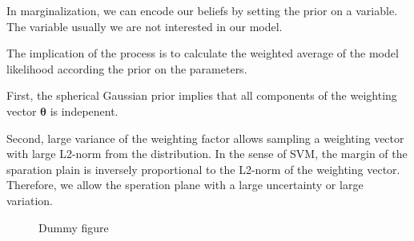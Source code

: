 \documentclass[12pt]{article}
\newenvironment{question}[2][Question]{\begin{trivlist}
\kern10pt
\item[\hskip \labelsep {\bfseries #1}\hskip \labelsep {\bfseries #2.}]}{\end{trivlist}}
\begin{document}
\begin{question}{20}
In marginalization, we can encode our beliefs by setting the prior on a variable.
The variable usually we are not interested in our model.

The implication of the process is to calculate the weighted average of the model
likelihood according the prior on the parameters.
\end{question}

\begin{question}{21}
First, the spherical Gaussian prior implies that all components of the weighting
vector $\bm{\theta}$ is indepenent.

Second, large variance of the weighting factor allows sampling a weighting vector
with large L2-norm from the distribution. 
In the sense of SVM, the margin of the sparation plain is 
inversely proportional to the L2-norm of the weighting vector. Therefore, we
allow the speration plane with a large uncertainty or large variation.
\end{question}

\begin{question}{22}
  \begin{figure}[!ht]
    \hfill
    \caption{Dummy figure}
    \label{fig:dummy}
  \end{figure}
\end{question}
\end{document}
